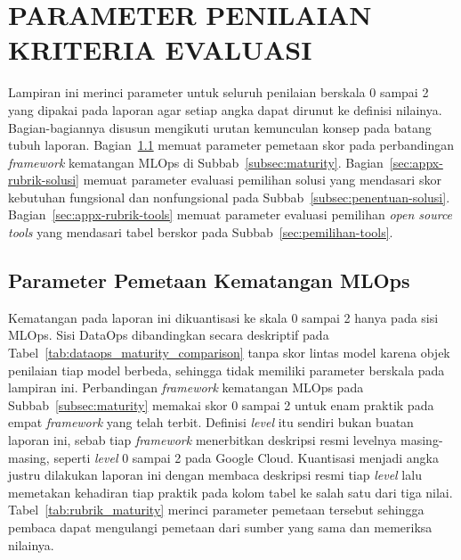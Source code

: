 \cleardoublepage
\chapter{PARAMETER PENILAIAN KRITERIA EVALUASI}
\label{appx:rubrik}

Lampiran ini merinci parameter untuk seluruh penilaian berskala 0 sampai 2 yang dipakai pada laporan agar setiap angka dapat dirunut ke definisi nilainya. Bagian-bagiannya disusun mengikuti urutan kemunculan konsep pada batang tubuh laporan. Bagian~\ref{sec:appx-rubrik-maturity} memuat parameter pemetaan skor pada perbandingan \textit{framework} kematangan MLOps di Subbab~\ref{subsec:maturity}. Bagian~\ref{sec:appx-rubrik-solusi} memuat parameter evaluasi pemilihan solusi yang mendasari skor kebutuhan fungsional dan nonfungsional pada Subbab~\ref{subsec:penentuan-solusi}. Bagian~\ref{sec:appx-rubrik-tools} memuat parameter evaluasi pemilihan \textit{open source tools} yang mendasari tabel berskor pada Subbab~\ref{sec:pemilihan-tools}.

\section{Parameter Pemetaan Kematangan MLOps}
\label{sec:appx-rubrik-maturity}

Kematangan pada laporan ini dikuantisasi ke skala 0 sampai 2 hanya pada sisi MLOps. Sisi DataOps dibandingkan secara deskriptif pada Tabel~\ref{tab:dataops_maturity_comparison} tanpa skor lintas model karena objek penilaian tiap model berbeda, sehingga tidak memiliki parameter berskala pada lampiran ini. Perbandingan \textit{framework} kematangan MLOps pada Subbab~\ref{subsec:maturity} memakai skor 0 sampai 2 untuk enam praktik pada empat \textit{framework} yang telah terbit. Definisi \textit{level} itu sendiri bukan buatan laporan ini, sebab tiap \textit{framework} menerbitkan deskripsi resmi levelnya masing-masing, seperti \textit{level} 0 sampai 2 pada Google Cloud. Kuantisasi menjadi angka justru dilakukan laporan ini dengan membaca deskripsi resmi tiap \textit{level} lalu memetakan kehadiran tiap praktik pada kolom tabel ke salah satu dari tiga nilai. Tabel~\ref{tab:rubrik_maturity} merinci parameter pemetaan tersebut sehingga pembaca dapat mengulangi pemetaan dari sumber yang sama dan memeriksa nilainya.



